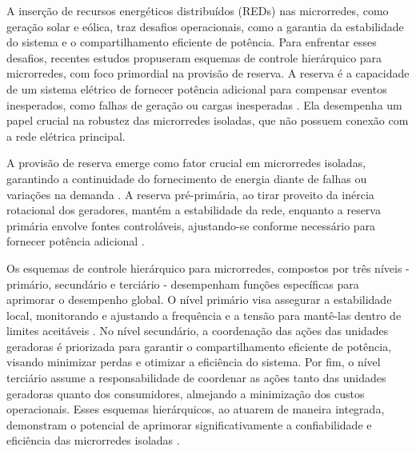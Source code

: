 A inserção de recursos energéticos distribuídos (REDs) nas microrredes, como geração solar e eólica, traz desafios operacionais, como a  garantia da estabilidade do sistema e o compartilhamento eficiente de potência. Para enfrentar esses desafios, recentes estudos  propuseram esquemas de controle hierárquico para microrredes, com foco primordial na provisão de reserva. A reserva é a capacidade de um sistema elétrico de fornecer potência adicional para compensar eventos inesperados, como falhas de geração ou cargas inesperadas . Ela desempenha um papel crucial na robustez das microrredes isoladas, que não possuem conexão com a rede elétrica principal. 

A provisão de reserva emerge como fator crucial em microrredes isoladas, garantindo a continuidade do fornecimento de energia diante de falhas ou variações na demanda . A reserva pré-primária, ao tirar proveito da inércia rotacional dos geradores, mantém a estabilidade da rede, enquanto a reserva primária envolve fontes controláveis, ajustando-se conforme necessário para fornecer potência adicional .

Os esquemas de controle hierárquico para microrredes, compostos por três níveis - primário, secundário e terciário - desempenham funções específicas para aprimorar o desempenho global. O nível primário visa assegurar a estabilidade local, monitorando e ajustando a frequência e a tensão para mantê-las dentro de limites aceitáveis . No nível secundário, a coordenação das ações das unidades geradoras é priorizada para garantir o compartilhamento eficiente de potência, visando minimizar perdas e otimizar a eficiência do sistema. Por fim, o nível terciário assume a responsabilidade de coordenar as ações tanto das unidades geradoras quanto dos consumidores, almejando a minimização dos custos operacionais. Esses esquemas hierárquicos, ao atuarem de maneira integrada, demonstram o potencial de aprimorar significativamente a confiabilidade e eficiência das microrredes isoladas .


